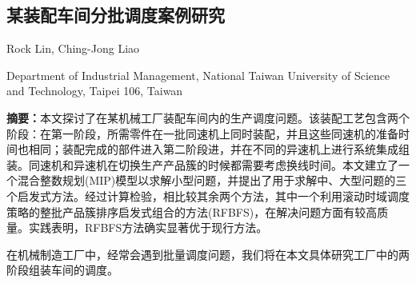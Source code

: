 \begin{Abstract}
\chapter*{某装配车间分批调度案例研究}
\begin{center}
\vspace{2mm}
{
 {\xiaosi Rock Lin, Ching-Jong Liao}

 {\xiaowu Department of Industrial Management, National Taiwan University of Science and Technology, Taipei 106, Taiwan}
}
\end{center}
{\wuhao \songti 
\noindent \textbf{摘要：}本文探讨了在某机械工厂装配车间内的生产调度问题。该装配工艺包含两个阶段：在第一阶段，所需零件在一批同速机上同时装配，并且这些同速机的准备时间也相同；装配完成的部件进入第二阶段进，并在不同的异速机上进行系统集成组装。同速机和异速机在切换生产产品簇的时候都需要考虑换线时间。本文建立了一个混合整数规划(MIP)模型以求解小型问题，并提出了用于求解中、大型问题的三个启发式方法。经过计算检验，相比较其余两个方法，其中一个利用滚动时域调度策略的整批产品簇排序启发式组合的方法(RFBFS)，在解决问题方面有较高质量。实践表明，RFBFS方法确实显著优于现行方法。

}
\end{Abstract}

在机械制造工厂中，经常会遇到批量调度问题，我们将在本文具体研究工厂中的两阶段组装车间的调度。



